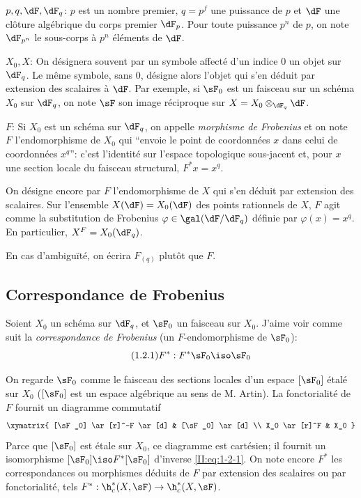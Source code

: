 $p,q,\dF,\dF_q$: $p$ est un nombre premier, $q=p^f$ une puissance de $p$ et 
$\dF$ une clôture algébrique du corps premier $\dF_p$. Pour toute puissance 
$p^n$ de $p$, on note $\dF_{p^n}$ le sous-corps à $p^n$ éléments de $\dF$. 

$X_0,X$: On désignera souvent par un symbole affecté d'un indice $0$ un objet 
sur $\dF_q$. Le même symbole, sans $0$, désigne alors l'objet qui s'en déduit 
par extension des scalaires à $\dF$. Par exemple, si $\sF_0$ est un faisceau 
sur un schéma $X_0$ sur $\dF_q$, on note $\sF$ son image réciproque sur 
$X=X_0\otimes_{\dF_q} \dF$. 

$F$: Si $X_0$ est un schéma sur $\dF_q$, on appelle \emph{morphisme de 
Frobenius} et on note $F$ l'endomorphisme de $X_0$ qui ``envoie le point de 
coordonnées $x$ dans celui de coordonnées $x^q$'': c'est l'identité sur 
l'espace topologique sous-jacent et, pour $x$ une section locale du faisceau 
structural, $F^* x = x^q$. 

On désigne encore par $F$ l'endomorphisme de $X$ qui s'en déduit par 
extension des scalaires. Sur l'ensemble $X(\dF) = X_0(\dF)$ des points 
rationnels de $X$, $F$ agit comme la substitution de Frobenius 
$\varphi\in\gal(\dF/\dF_q)$ définie par $\varphi(x)=x^q$. En particulier, 
$X^F=X_0(\dF_q)$. 

En cas d'ambiguïté, on écrira $F_{(q)}$ plutôt que $F$. 










\subsection{Correspondance de Frobenius}\label{II:1-2}

Soient $X_0$ un schéma sur $\dF_q$, et $\sF_0$ un faisceau sur $X_0$. J'aime 
voir comme suit la \emph{correspondance de Frobenius} (un $F$-endomorphisme de 
$\sF_0$): 
\begin{equation*}\tag{1.2.1}\label{II:eq:1-2-1}
  F^* : F^*\sF_0 \iso \sF_0
\end{equation*}

On regarde $\sF_0$ comme le faisceau des sections locales d'un espace 
$[\sF_0]$ étalé sur $X_0$ ($[\sF_0]$ est un espace algébrique au sens de M. 
Artin). La fonctorialité de $F$ fournit un diagramme commutatif 
\[\xymatrix{
  [\sF_0] \ar[r]^-F \ar[d]
    & [\sF_0] \ar[d] \\
  X_0 \ar[r]^F 
    & X_0
}\]
Parce que $[\sF_0]$ est étale sur $X_0$, ce diagramme est cartésien; il fournit 
un isomorphisme $[\sF_0]\iso F^*[\sF_0]$ d'inverse \eqref{II:eq:1-2-1}. On note 
encore $F^*$ les correspondances ou morphismes déduits de $F$ par extension 
des scalaires ou par fonctorialité, tels 
$F^*:\h_c^*(X,\sF)\to \h_c^*(X,\sF)$. 

